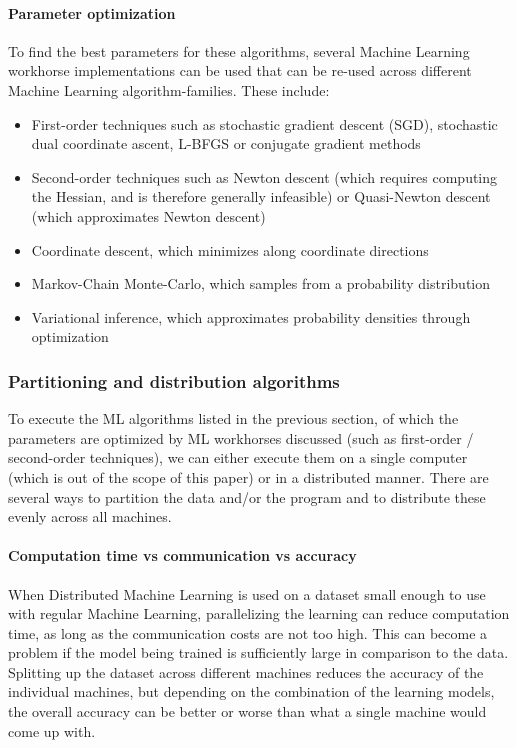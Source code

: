 \paragraph{Parameter optimization}
To find the best parameters for these algorithms, several Machine Learning workhorse implementations can be used that can be re-used across different Machine Learning algorithm-families. These include:
\begin{itemize}
	\item First-order techniques such as stochastic gradient descent (SGD)\cite{bottou2010large}, stochastic dual coordinate ascent\cite{Shal13}, L-BFGS\cite{liu1989limited} or conjugate gradient methods\cite{hestenes1952methods}\cite{dai1999nonlinear}
	\item Second-order techniques such as Newton descent\cite{polyak2007newton} (which requires computing the Hessian, and is therefore generally infeasible) or Quasi-Newton descent\cite{byrd2016stochastic} (which approximates Newton descent)
	\item Coordinate descent\cite{wright2015coordinate}, which minimizes along coordinate directions
	\item Markov-Chain Monte-Carlo\cite{brooks1998markov}, which samples from a probability distribution
	\item Variational inference\cite{Blei17}, which approximates probability densities through optimization
\end{itemize}




\subsubsection{Partitioning and distribution algorithms}
To execute the ML algorithms listed in the previous section, of which the parameters are optimized by ML workhorses discussed (such as first-order / second-order techniques), we can either execute them on a single computer (which is out of the scope of this paper) or in a distributed manner. There are several ways to partition the data and/or the program and to distribute these evenly across all machines.


\paragraph{Computation time vs communication vs accuracy}

When Distributed Machine Learning is used on a dataset small enough to use with regular Machine Learning, parallelizing the learning can reduce computation time, as long as the communication costs are not too high. This can become a problem if the model being trained is sufficiently large in comparison to the data. Splitting up the dataset across different machines reduces the accuracy of the individual machines, but depending on the combination of the learning models, the overall accuracy can be better or worse than what a single machine would come up with.

